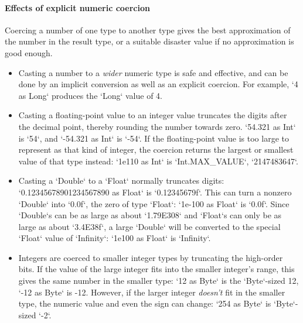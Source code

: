 
\paragraph{Effects of explicit numeric coercion}
\label{sec:effects-of-explicit-numeric-coercions}

Coercing a number of one type to another type gives the best approximation of
the number in the result type, or a suitable disaster value if no
approximation is good enough.  

\begin{itemize}
\item Casting a number to a {\em wider} numeric type is safe and effective,
      and can be done by an implicit conversion as well as an explicit
      coercion.  For example, \xcd`4 as Long` produces the \xcd`Long` value of
      4. 
\item Casting a floating-point value to an integer value truncates the digits
      after the decimal point, thereby rounding the number towards zero.  
      \xcd`54.321 as Int` is \xcd`54`, and 
      \xcd`-54.321 as Int` is \xcd`-54`.
      If the floating-point value is too large to represent as that kind of
      integer, the coercion returns the largest or smallest value of that type
      instead: \xcd`1e110 as Int` is 
      \xcd`Int.MAX_VALUE`, \xcd`2147483647`. 

\item Casting a \xcd`Double` to a \xcd`Float` normally truncates digits: 
      \xcd`0.12345678901234567890 as Float` is \xcd`0.12345679f`.  This can
      turn a nonzero \xcd`Double` into \xcd`0.0f`, the zero of type
      \xcd`Float`: 
      \xcd`1e-100 as Float` is \xcd`0.0f`.  Since 
      \xcd`Double`s can be as large as about \xcd`1.79E308` and \xcd`Float`s
      can only be as large as about \xcd`3.4E38f`, a large \xcd`Double` will
      be converted to the special \xcd`Float` value of \xcd`Infinity`: 
      \xcd`1e100 as Float` is \xcd`Infinity`.
\item Integers are coerced to smaller integer types by truncating the
      high-order bits. If the value of the large integer fits into the smaller
      integer's range, this gives the same number in the smaller type: 
      \xcd`12 as Byte` is the \xcd`Byte`-sized 12, 
      \xcd`-12 as Byte` is -12. 
      However, if the larger integer {\em doesn't} fit in the smaller type,
      the numeric value and even the sign can change: \xcd`254 as Byte` is
      \xcd`Byte`-sized \xcd`-2`.  


\end{itemize}

